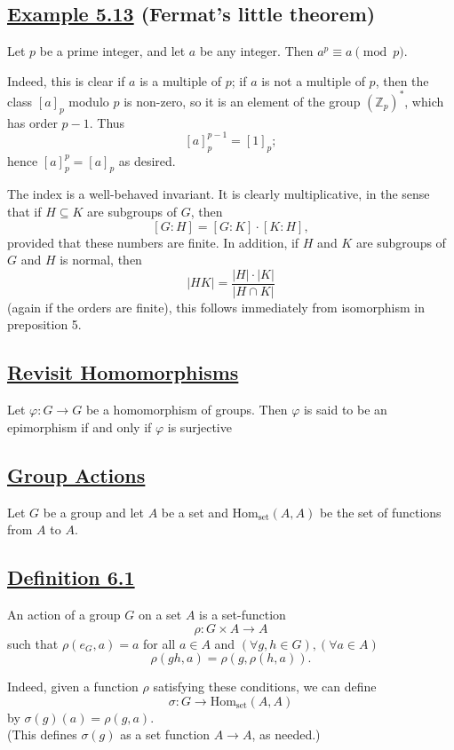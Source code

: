 \vspace{1.5em}

\subsection*{\underline{Example 5.13} (Fermat's little theorem)}
Let $p$ be a prime integer, and let $a$ be any integer. Then $a^p \equiv a \pmod p$.

Indeed, this is clear if $a$ is a multiple of $p$; if $a$ is not a multiple of $p$, then the class $[a]_p$ modulo $p$ is non-zero, so it is an element of the group $(\mathbb{Z}_p)^*$, which has order $p-1$. Thus
\[
[a]_p^{p-1} = [1]_p;
\]
hence $[a]_p^p = [a]_p$ as desired.

\vspace{2em}

The index is a well-behaved invariant. It is clearly multiplicative, in the sense that if $H \subseteq K$ are subgroups of $G$, then
\[
[G:H] = [G:K] \cdot [K:H],
\]
provided that these numbers are finite. In addition, if $H$ and $K$ are subgroups of $G$ and $H$ is normal, then
\[
|HK| = \frac{|H| \cdot |K|}{|H \cap K|}
\]
(again if the orders are finite), this follows immediately from isomorphism in preposition 5.
\subsection*{\underline{Revisit Homomorphisms}}
Let $\varphi : G \to G$ be a homomorphism of groups. Then $\varphi$ is said to be an epimorphism if and only if $\varphi$ is surjective

\subsection*{\underline{Group Actions}}
Let $G$ be a group and let $A$ be a set and $\text{Hom}_{\text{set}}(A,A)$ be the set of functions from $A$ to $A$.

\subsection*{\underline{Definition 6.1}}
An action of a group $G$ on a set $A$ is a set-function
\[
\rho : G \times A \longrightarrow A
\]
such that $\rho(e_G, a) = a$ for all $a \in A$ and $(\forall g, h \in G), (\forall a \in A)$
\[
\rho(gh, a) = \rho(g, \rho(h, a)).
\]

\vspace{1em}

\noindent Indeed, given a function $\rho$ satisfying these conditions, we can define
\[
\sigma : G \longrightarrow \text{Hom}_{\text{set}}(A,A)
\]
by $\sigma(g)(a) = \rho(g, a)$. \\
(This defines $\sigma(g)$ as a set function $A \rightarrow A$, as needed.)

